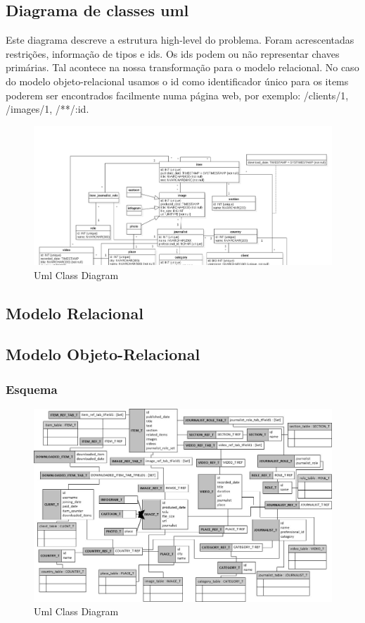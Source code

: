 \documentclass[a4paper,11pt]{article}
\begin{document}
\subsection{Diagrama de classes uml}
Este diagrama descreve a estrutura high-level do problema. Foram acrescentadas restrições, informação de tipos e ids. Os ids podem ou não representar chaves primárias. Tal acontece na nossa transformação para o modelo relacional. No caso do modelo objeto-relacional usamos o id como identificador único para os items poderem ser encontrados facilmente numa página web, por exemplo: /clients/1, /images/1, /**/:id. 

\begin{figure}[H]
	\centering
    	\includegraphics[width=1.0\textwidth]{../relationalClassDiagram.png}
    \caption{Uml Class Diagram}
\end{figure}

\subsection{Modelo Relacional}


\subsection{Modelo Objeto-Relacional}

\subsubsection{Esquema}
\begin{figure}[H]
	\centering
    	\includegraphics[width=1.0\textwidth]{../objectRelationalModel.jpg}
    \caption{Uml Class Diagram}
\end{figure}
\end{document}
